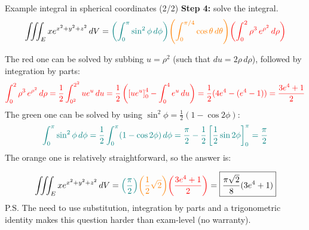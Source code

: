 \begin{frame}{Example integral in spherical coordinates (2/2)}
    \footnotesize
    \textbf{Step 4:} solve the integral.
    \[
        \iiint_E xe^{x^2+y^2+z^2}\,dV =\textcolor{teal}{\left(\int_{0}^{\pi}\sin^2\phi\,d\phi\right)}\textcolor{orange}{\left(\int_0^{\pi/4}\cos\theta\,d\theta\right)}\textcolor{red}{\left(\int_0^2\rho^3\,e^{\rho^2}\,d\rho\right)}
    \]

    \pause The red one can be solved by subbing $u=\rho^2$ (such that $du=2\rho \,d\rho$), followed by integration by parts:
    \[\textcolor{red}{\int_0^2\rho^3\,e^{\rho^2}\,d\rho=\frac{1}{2}\int_{0^2}^{2^2}ue^u\,du=\frac{1}{2}\left(\left[ue^u\right]_0^4-\int_0^4e^u\,du\right)=\frac{1}{2}(4e^4-(e^4-1))=\frac{3e^4+1}{2}}\]
    \pause The green one can be solved by using $\sin^2\phi=\frac{1}{2}\left(1-\cos2\phi\right)$:
    \[\textcolor{teal}{\int_{0}^{\pi}\sin^2\phi\,d\phi=\frac{1}{2}\int_{0}^{\pi}(1-\cos2\phi)\,d\phi=\frac{\pi}{2}-\frac{1}{2}\left[\frac{1}{2}\sin2\phi\right]_{0}^{\pi}=\frac{\pi}{2}}\]
    \pause The orange one is relatively straightforward, so the answer is:

    \[
        \iiint_E xe^{x^2+y^2+z^2}\,dV =\textcolor{teal}{\left(\frac{\pi}{2}\right)}\textcolor{orange}{\left(\frac{1}{2}\sqrt{2}\right)}\textcolor{red}{\left(\frac{3e^4+1}{2}\right)}=\boxed{\frac{\pi\sqrt2}{8}(3e^4+1)}
    \]
\scriptsize    P.S. The need to use substitution, integration by parts and a trigonometric identity makes this question harder than exam-level (no warranty).
\end{frame}
